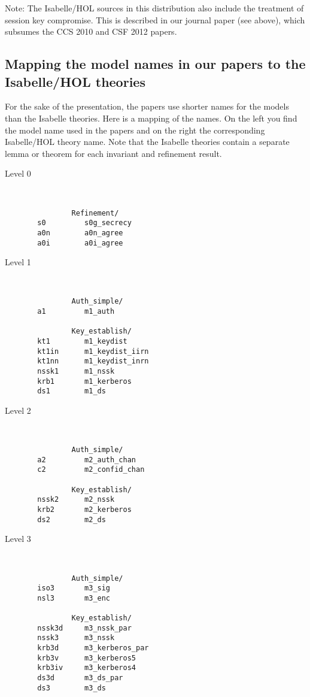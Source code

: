\documentclass[11pt,a4paper]{report}
\begin{document}
Note: The Isabelle/HOL sources in this distribution also include the treatment
of session key compromise. This is described in our journal paper (see above), 
which subsumes the CCS 2010 and CSF 2012 papers.

\subsection*{Mapping the model names in our papers to the Isabelle/HOL theories}

For the sake of the presentation, the papers use shorter names for the models 
than the Isabelle theories.  Here is a mapping of the names. On the left you 
find the model name used in the papers and on the right the corresponding
Isabelle/HOL theory name. Note that the Isabelle theories contain a 
separate lemma or theorem for each invariant and refinement result.

\begin{description}
\item[Level 0] \mbox{ }
\begin{verbatim}
          Refinement/
  s0         s0g_secrecy   		  
  a0n        a0n_agree             
  a0i        a0i_agree             
\end{verbatim}

\item[Level 1] \mbox{ }
\begin{verbatim}
          Auth_simple/
  a1         m1_auth

          Key_establish/
  kt1        m1_keydist            
  kt1in      m1_keydist_iirn       
  kt1nn      m1_keydist_inrn
  nssk1      m1_nssk
  krb1       m1_kerberos 
  ds1        m1_ds
\end{verbatim}

\item[Level 2] \mbox{ }
\begin{verbatim}
          Auth_simple/
  a2         m2_auth_chan
  c2         m2_confid_chan

          Key_establish/  				
  nssk2      m2_nssk
  krb2       m2_kerberos 
  ds2        m2_ds
\end{verbatim}

\item[Level 3] \mbox{ }
\begin{verbatim}
          Auth_simple/
  iso3       m3_sig
  nsl3       m3_enc
  
          Key_establish/  				
  nssk3d     m3_nssk_par
  nssk3      m3_nssk
  krb3d      m3_kerberos_par
  krb3v      m3_kerberos5  
  krb3iv     m3_kerberos4  
  ds3d       m3_ds_par
  ds3        m3_ds
\end{verbatim}
\end{description}






\end{document}
